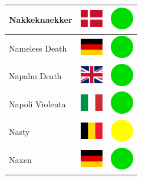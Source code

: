 \documentclass[12pt, a4paper, twoside]{report}
\begin{document}
\begin{center}
\begin{longtable}{|p{5cm}|p{2cm}|p{2cm}|}
 Nakkeknaekker                                              & \includegraphics[width=1cm]{../img/flags/dk} &   \includegraphics[width=1cm]{../likes/y} \\ \hline
 Nameless Death                                             & \includegraphics[width=1cm]{../img/flags/de} &   \includegraphics[width=1cm]{../likes/y} \\ \hline
 Napalm Death                                               & \includegraphics[width=1cm]{../img/flags/gb} &   \includegraphics[width=1cm]{../likes/y} \\ \hline
 Napoli Violenta                                            & \includegraphics[width=1cm]{../img/flags/it} &   \includegraphics[width=1cm]{../likes/y} \\ \hline
 Nasty                                                      & \includegraphics[width=1cm]{../img/flags/be} &   \includegraphics[width=1cm]{../likes/m} \\ \hline
 Naxen                                                      & \includegraphics[width=1cm]{../img/flags/de} &   \includegraphics[width=1cm]{../likes/y} \\ \hline

\end{longtable}
\end{center}
\end{document}
